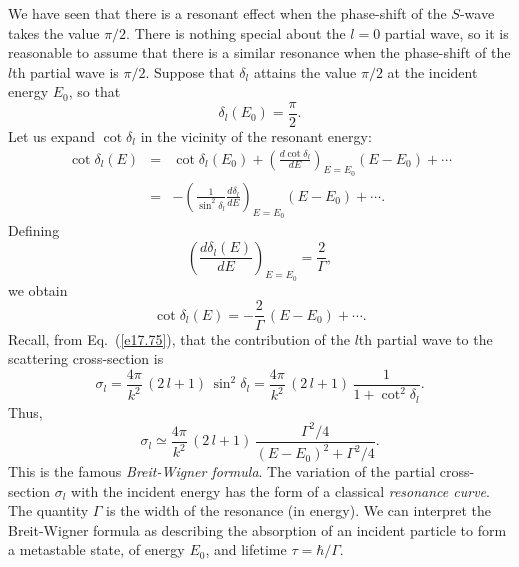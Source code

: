 We have seen that there is a resonant effect when the phase-shift of
the $S$-wave takes the value $\pi/2$.  There is nothing special about
the $l=0$ partial wave, so it is reasonable to assume that there
is a similar resonance when the phase-shift of the $l$th partial
wave is $\pi/2$. Suppose that $\delta_l$ attains the value
$\pi/2$ at the incident energy $E_0$, so that
\begin{equation}
\delta_l(E_0) = \frac{\pi}{2}.
\end{equation}
Let us expand $\cot \delta_l$ in the vicinity of the resonant energy:
\begin{eqnarray}
\cot \delta_l(E)& =& \cot \delta_l(E_0) +\left(
\frac{ d \cot\delta_l}{d E}\right)_{E=E_0}(E-E_0) + \cdots\nonumber\\[0.5ex]
&=& - \left(\frac{1}{\sin^2\delta_l}\frac{d\delta_l}{d E}\right)_{E=E_0}
(E-E_0)+\cdots.
\end{eqnarray}
Defining
\begin{equation}
\left(\frac{d \delta_l(E)}{d E} \right)_{E=E_0} = \frac{2}{\Gamma},
\end{equation}
we obtain
\begin{equation}
\cot\delta_l(E) = - \frac{2}{\Gamma} \,(E-E_0) + \cdots.
\end{equation}
Recall, from Eq.~(\ref{e17.75}), that the contribution of the $l$th partial wave
to the scattering cross-section is 
\begin{equation}
\sigma_l = \frac{4\pi}{k^2} \,(2\,l+1)\,\sin^2\delta_l 
= \frac{4\pi}{k^2} \,(2\,l+1)\,\frac{1}{1+\cot^2\delta_l}.
\end{equation}
Thus,
\begin{equation}
\sigma_l \simeq \frac{4\pi}{k^2} \,(2\,l+1)\,
\frac{\Gamma^2/4}{(E-E_0)^2 + \Gamma^2/4}.
\end{equation}
This is the famous {\em Breit-Wigner formula}. The variation of
the partial cross-section $\sigma_l$ with the incident energy has
the form of a classical {\em resonance curve}. The quantity $\Gamma$ is
the width of the resonance (in energy). We can interpret the
Breit-Wigner formula as describing the absorption of an incident particle
to form a metastable state, of energy $E_0$, and lifetime $\tau = \hbar/
\Gamma$.

